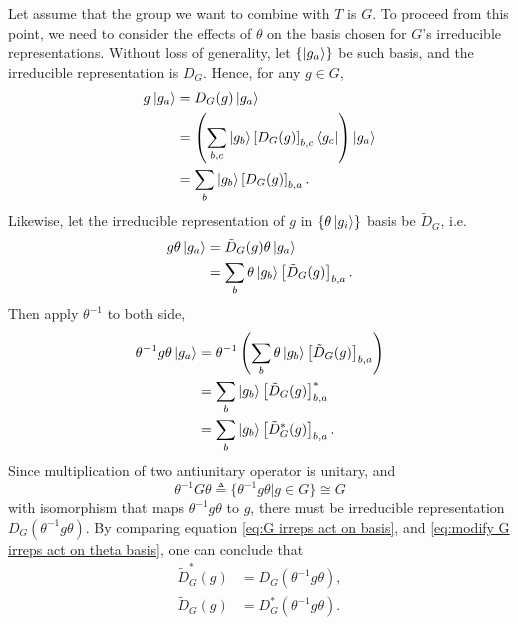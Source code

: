 \documentclass[preprint, 12pt]{revtex4-2}
\numberwithin{equation}{section}
\begin{document}
Let assume that the group we want to combine with $T$ is $G$. To proceed from this point, we need to consider the effects of $\theta$ on the basis chosen for $G$'s irreducible representations. Without loss of generality, let $\{\ket{g_a}\}$ be such basis, and the irreducible representation is $D_G$. Hence, for any $g\in G$,
\begin{equation}\label{eq:G irreps act on basis}
    \begin{aligned}
        g\ket{g_a} &= D_G(g)\ket{g_a} \\
        &= \left(\sum_{b, c}\ket{g_b}\left[D_G(g)\right]_{b, c}\bra{g_c}\right)\ket{g_a} \\
        &= \sum_{b}\ket{g_b}\left[D_G(g)\right]_{b, a}.
    \end{aligned}
\end{equation}
Likewise, let the irreducible representation of $g$ in $\{\theta\ket{g_i}\}$ basis be $\tilde{D}_G$, i.e.
\begin{equation}\label{eq:G irreps act on theta basis}
    \begin{aligned}
        g\theta\ket{g_a} &= \tilde{D}_G(g)\theta\ket{g_a} \\
        &= \sum_{b}\theta\ket{g_b}\left[\tilde{D}_G(g)\right]_{b, a}.
    \end{aligned}
\end{equation}
Then apply $\theta^{-1}$ to both side,
\begin{equation}\label{eq:modify G irreps act on theta basis}
    \begin{aligned}
        \theta^{-1}g\theta\ket{g_a} &= \theta^{-1}\left(\sum_{b}\theta\ket{g_b}\left[\tilde{D}_G(g)\right]_{b, a}\right) \\
        &= \sum_{b}\ket{g_b}\left[\tilde{D}_G(g)\right]_{b, a}^\ast \\
        &= \sum_{b}\ket{g_b}\left[\tilde{D}_G^\ast(g)\right]_{b, a}.
    \end{aligned}
\end{equation}
Since multiplication of two antiunitary operator is unitary, and
\begin{equation}\label{eq:modify G}
    \theta^{-1}G\theta\triangleq\{\theta^{-1}g\theta|g\in G\}\cong G
\end{equation}
with isomorphism that maps $\theta^{-1}g\theta$ to $g$, there must be irreducible representation $D_G(\theta^{-1}g\theta)$. By comparing equation \ref{eq:G irreps act on basis}, and \ref{eq:modify G irreps act on theta basis}, one can conclude that
\begin{equation}\label{eq:modify G irreps}
    \begin{aligned}
        \tilde{D}_G^\ast(g) &= D_G(\theta^{-1}g\theta), \\
        \tilde{D}_G(g) &= D_G^\ast(\theta^{-1}g\theta).
    \end{aligned}
\end{equation}
\end{document}
